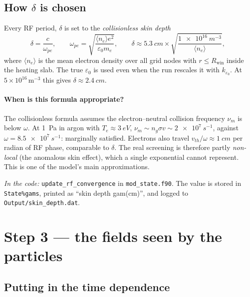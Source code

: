 \documentclass[11pt,a4paper]{article}
\newcommand{\code}[1]{\texttt{#1}}
\newcommand{\incode}[1]{\par\smallskip\noindent\textit{In the code:} #1\par\smallskip}
\begin{document}
\subsection{How $\delta$ is chosen}
\label{sec:delta}

Every RF period, $\delta$ is set to the \emph{collisionless skin depth}
\begin{equation}
  \delta = \frac{c}{\omega_{pe}},\qquad
  \omega_{pe} = \sqrt{\frac{\langle n_e\rangle e^2}{\varepsilon_0 m_e}},
  \qquad
  \delta \approx \SI{5.3}{cm}\times\sqrt{\frac{\SI{1e16}{m^{-3}}}{\langle n_e\rangle}},
\end{equation}
where $\langle n_e\rangle$ is the mean electron density over all grid nodes
with $r\le R_{\mathrm{win}}$ inside the heating slab. The true
$\varepsilon_0$ is used even when the run rescales it with $k_{\varepsilon_0}$.
At $5\times10^{16}$\,m$^{-3}$ this gives $\delta\approx\SI{2.4}{cm}$.

\paragraph{When is this formula appropriate?} The collisionless formula
assumes the electron--neutral collision frequency $\nu_m$ is below
$\omega$. At \SI{1}{Pa} in argon with $T_e\approx\SI{3}{eV}$,
$\nu_m \sim n_g\sigma v \sim \SI{2e7}{s^{-1}}$, against
$\omega = \SI{8.5e7}{s^{-1}}$: marginally satisfied. Electrons also travel
$v_{th}/\omega\approx\SI{1}{cm}$ per radian of RF phase, comparable to
$\delta$. The real screening is therefore partly \emph{non-local}
(the anomalous skin effect), which a single exponential cannot represent.
This is one of the model's main approximations.

\incode{\code{update\_rf\_convergence} in \code{mod\_state.f90}. The value
is stored in \code{State\%gams}, printed as ``skin depth gam(cm)'', and
logged to \code{Output/skin\_depth.dat}.}

\section{Step 3 --- the fields seen by the particles}

\subsection{Putting in the time dependence}
\end{document}
